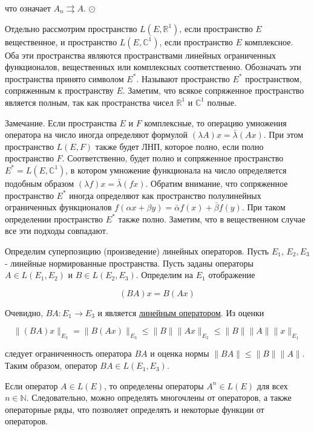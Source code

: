 \documentclass[a4paper, 12pt]{extarticle}
\begin{document}
что означает $A_{n} \rightrightarrows A$. $\odot$

Отдельно рассмотрим пространство $L\left(E, \mathbb{R}^{1}\right)$, если пространство $E$ вещественное, и пространство $L\left(E, \mathbb{C}^{1}\right)$, если пространство $E$ комплексное. Оба эти пространства являются пространствами линейных ограниченных функционалов, вещественных или комплексных соответственно. Обозначать эти пространства принято символом $E^{*}$. Называют пространство $E^{*}$ пространством, сопряженным к пространству $E$. Заметим, что всякое сопряженное пространство является полным, так как пространства чисел $\mathbb{R}^{1}$ и $\mathbb{C}^{1}$ полные.

Замечание. Если пространства $E$ и $F$ комплексные, то операцию умножения оператора на число иногда определяют формулой $(\lambda A) x=\bar{\lambda}(A x)$. При этом пространство $L(E, F)$ также будет ЛНП, которое полно, если полно пространство $F$. Соответственно, будет полно и сопряженное пространство $E^{*}=L\left(E, \mathbb{C}^{1}\right)$, в котором умножение функционала на число определяется подобным образом $(\lambda f) x=\bar{\lambda}(f x)$. Обратим внимание, что сопряженное пространство $E^{*}$ иногда определяют как пространство полулинейных ограниченных функционалов $f(\alpha x+\beta y)=\bar{\alpha} f(x)+\bar{\beta} f(y)$. При таком определении пространство $E^{*}$ также полно. Заметим, что в вещественном случае все эти подходы совпадают.

Определим суперпозицию (произведение) линейных операторов. Пусть $E_{1}$, $E_{2}, E_{3}$ - линейные нормированные пространства. Пусть заданы операторы $A \in L\left(E_{1}, E_{2}\right)$ и $B \in L\left(E_{2}, E_{3}\right)$. Определим на $E_{1}$ отображение

$$
	(B A) x=B(A x)
$$

Очевидно, $B A: E_{1} \rightarrow E_{3}$ и является \hyperlink{linOperator}{линейным оператором}. Из оценки

$$
	\|(B A) x\|_{E_{3}}=\|B(A x)\|_{E_{3}} \leq\|B\|\|A x\|_{E_{2}} \leq\|B\|\|A\|\|x\|_{E_{1}}
$$

следует ограниченность оператора $B A$ и оценка нормы $\|B A\| \leq\|B\|\|A\|$. Таким образом, оператор $B A \in L\left(E_{1}, E_{3}\right)$.

Если оператор $A \in L(E)$, то определены операторы $A^{n} \in L(E)$ для всех $n \in \mathbb{N}$. Следовательно, можно определять многочлены от операторов, а также операторные ряды, что позволяет определять и некоторые функции от операторов.
\end{document}

